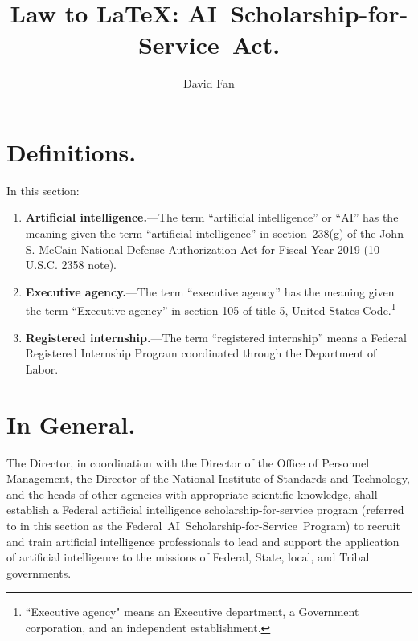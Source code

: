 \documentclass{article}
\title{Law to \LaTeX: AI~Scholarship-for-Service~Act.}
\author{David Fan}
\begin{document}
\maketitle



\tableofcontents

    \section{Definitions.}In this section:
\begin{enumerate}
            \item {\bf Artificial intelligence.}---The term ``artificial 
        intelligence'' or ``AI'' has the meaning given the term 
        ``artificial intelligence'' in \hyperref[appendix:ai]{section~238(g)} of the John S. 
        McCain National Defense Authorization Act for Fiscal Year 2019
        (10 U.S.C. 2358 note).
            \item {\bf Executive agency.}---The term ``executive agency'' has 
        the meaning given the term ``Executive agency'' in section 105 
        of title 5, United States Code.\footnote{``Executive agency" means an Executive department, a Government corporation, and an independent establishment.}
            \item {\bf Registered internship.}---The term ``registered 
        internship'' means a Federal Registered Internship Program 
        coordinated through the Department of Labor.
\end{enumerate}
    \section{In General.}The Director, in coordination with the Director of 
the Office of Personnel Management, the Director of the National 
Institute of Standards and Technology, and the heads of other agencies 
with appropriate scientific knowledge, shall establish a Federal 
artificial intelligence scholarship-for-service program (referred to in 
this section as the Federal~AI~Scholarship-for-Service~Program) to 
recruit and train artificial intelligence professionals to lead and 
support the application of artificial intelligence to the missions of 
Federal, State, local, and Tribal governments.
\end{document}

